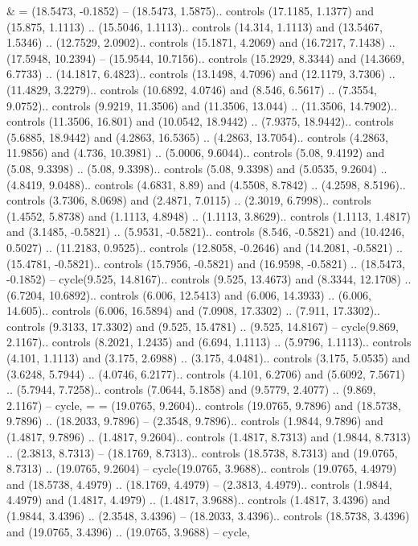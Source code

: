 {&} = {(18.5473, -0.1852) -- (18.5473, 1.5875).. controls (17.1185, 1.1377) and (15.875, 1.1113) .. (15.5046, 1.1113).. controls (14.314, 1.1113) and (13.5467, 1.5346) .. (12.7529, 2.0902).. controls (15.1871, 4.2069) and (16.7217, 7.1438) .. (17.5948, 10.2394) -- (15.9544, 10.7156).. controls (15.2929, 8.3344) and (14.3669, 6.7733) .. (14.1817, 6.4823).. controls (13.1498, 4.7096) and (12.1179, 3.7306) .. (11.4829, 3.2279).. controls (10.6892, 4.0746) and (8.546, 6.5617) .. (7.3554, 9.0752).. controls (9.9219, 11.3506) and (11.3506, 13.044) .. (11.3506, 14.7902).. controls (11.3506, 16.801) and (10.0542, 18.9442) .. (7.9375, 18.9442).. controls (5.6885, 18.9442) and (4.2863, 16.5365) .. (4.2863, 13.7054).. controls (4.2863, 11.9856) and (4.736, 10.3981) .. (5.0006, 9.6044).. controls (5.08, 9.4192) and (5.08, 9.3398) .. (5.08, 9.3398).. controls (5.08, 9.3398) and (5.0535, 9.2604) .. (4.8419, 9.0488).. controls (4.6831, 8.89) and (4.5508, 8.7842) .. (4.2598, 8.5196).. controls (3.7306, 8.0698) and (2.4871, 7.0115) .. (2.3019, 6.7998).. controls (1.4552, 5.8738) and (1.1113, 4.8948) .. (1.1113, 3.8629).. controls (1.1113, 1.4817) and (3.1485, -0.5821) .. (5.9531, -0.5821).. controls (8.546, -0.5821) and (10.4246, 0.5027) .. (11.2183, 0.9525).. controls (12.8058, -0.2646) and (14.2081, -0.5821) .. (15.4781, -0.5821).. controls (15.7956, -0.5821) and (16.9598, -0.5821) .. (18.5473, -0.1852) -- cycle(9.525, 14.8167).. controls (9.525, 13.4673) and (8.3344, 12.1708) .. (6.7204, 10.6892).. controls (6.006, 12.5413) and (6.006, 14.3933) .. (6.006, 14.605).. controls (6.006, 16.5894) and (7.0908, 17.3302) .. (7.911, 17.3302).. controls (9.3133, 17.3302) and (9.525, 15.4781) .. (9.525, 14.8167) -- cycle(9.869, 2.1167).. controls (8.2021, 1.2435) and (6.694, 1.1113) .. (5.9796, 1.1113).. controls (4.101, 1.1113) and (3.175, 2.6988) .. (3.175, 4.0481).. controls (3.175, 5.0535) and (3.6248, 5.7944) .. (4.0746, 6.2177).. controls (4.101, 6.2706) and (5.6092, 7.5671) .. (5.7944, 7.7258).. controls (7.0644, 5.1858) and (9.5779, 2.4077) .. (9.869, 2.1167) -- cycle},
{=} = {(19.0765, 9.2604).. controls (19.0765, 9.7896) and (18.5738, 9.7896) .. (18.2033, 9.7896) -- (2.3548, 9.7896).. controls (1.9844, 9.7896) and (1.4817, 9.7896) .. (1.4817, 9.2604).. controls (1.4817, 8.7313) and (1.9844, 8.7313) .. (2.3813, 8.7313) -- (18.1769, 8.7313).. controls (18.5738, 8.7313) and (19.0765, 8.7313) .. (19.0765, 9.2604) -- cycle(19.0765, 3.9688).. controls (19.0765, 4.4979) and (18.5738, 4.4979) .. (18.1769, 4.4979) -- (2.3813, 4.4979).. controls (1.9844, 4.4979) and (1.4817, 4.4979) .. (1.4817, 3.9688).. controls (1.4817, 3.4396) and (1.9844, 3.4396) .. (2.3548, 3.4396) -- (18.2033, 3.4396).. controls (18.5738, 3.4396) and (19.0765, 3.4396) .. (19.0765, 3.9688) -- cycle},
